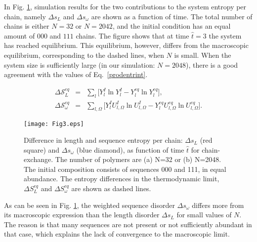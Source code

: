 \documentclass[
	amsmath,
	amssymb,
	a4paper,
	aip,		%
	jcp,		%
	reprint, twocolumn  %
	fleqn,
	showpacs,
	floatfix
]{revtex4-1}
\newcommand{\bea}{\begin{eqnarray}}
\newcommand{\eea}{\end{eqnarray}}
\begin{document}
In Fig. \ref{Totdisst2sp}, simulation results for the two contributions to the system entropy per chain, namely $\Delta s_L$ and 
$\Delta s_{\omega}$ are shown as a function of time. The total number of chains is either $N=32$ or $N=2042$, and
the initial condition has an equal amount of $000$ and $111$ chains.
The figure shows that at time $\hat{t}=3$ the system has reached equilibrium. This equilibrium, however, differs from the macroscopic equilibrium, 
corresponding to the dashed lines, when $N$ is small. When the system size is sufficiently large (in our simulation: $N=2048$), there is a good agreement
with the values of Eq.~\eqref{prodentrint}.

\bea
\Delta \mathcal{S}_{L}^{eq} &=& \sum_{l} \bigg[Y^{I}_{l} \ln Y^{I}_{l} - Y^{eq}_{l} \ln Y^{eq}_{l} \bigg] , 
\label{Specenteq3} \\ \nonumber
\Delta \mathcal{S}_{\omega}^{eq} &=& \sum_{l,\Omega} \bigg[Y^{I}_{l} U^{I}_{l, \Omega} \ln U^{I}_{l, \Omega} - Y^{eq}_{l} U^{eq}_{l,\Omega} \ln U^{eq}_{l,\Omega} \bigg] .
\eea
\begin{figure}[H]
\centering
\texttt{[image: Fig3.eps]} 
\caption{Difference in length and sequence entropy per chain: $\Delta s_L$ (red square) and $\Delta s_{\omega}$ (blue diamond), 
as function of time $\hat{t}$ for chain-exchange. The number of polymers are (a) N=32 or (b) N=2048. The initial composition consists 
of sequences 000 and 111, in equal abundance. The entropy differences in the thermodynamic limit, $\Delta S^{eq}_L $ and 
$\Delta S^{eq}_{\omega} $ are shown as dashed lines.}
\label{Totdisst2sp}
\end{figure}
As can be seen in Fig. \ref{Totdisst2sp}, the weighted sequence disorder $\Delta s_{\omega}$ differs more from its macroscopic expression 
than the length disorder $\Delta s_{L}$ for small values of $N$. 
The reason is that many sequences are not present or not sufficiently abundant in that case, 
which explains the lack of convergence to the macroscopic limit. 
\end{document}
